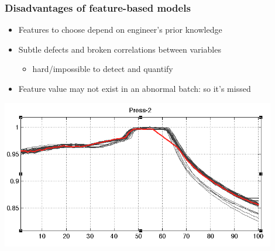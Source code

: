 \begin{frame}\frametitle{Disadvantages of feature-based models}

\begin{itemize}
	\item	Features to choose depend on engineer's prior knowledge
	
	\item	Subtle defects and broken correlations between variables 
	
			\begin{itemize}
				\item	hard/impossible to detect and quantify
			\end{itemize}

	\item	Feature value may not exist in an abnormal batch: so it's missed

\end{itemize}

\begin{center}
	\includegraphics[width=0.9\textwidth]{images/features-subtle-problems-can-go-undetected.png}
\end{center}

\end{frame}

